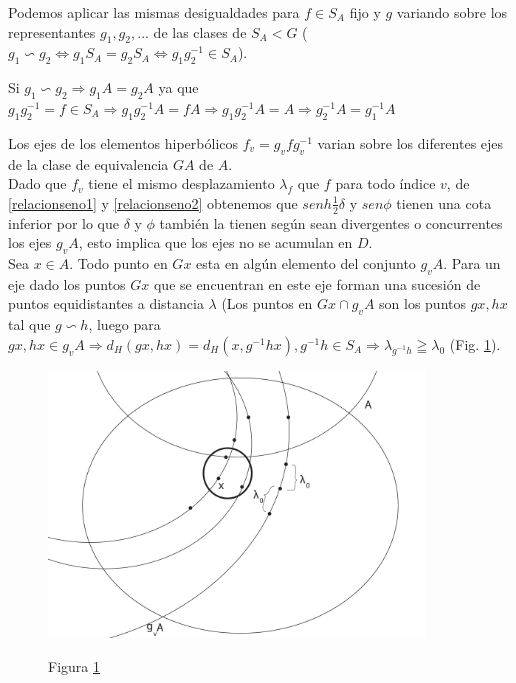 Podemos aplicar las mismas desigualdades para $f \in S_{A}$ fijo y
$g $ variando sobre los representantes $g_{1},g_{2},...$ de las
clases de $S_{A} < G$ ($g_{1} \backsim g_{2} \Leftrightarrow
g_{1}S_{A} = g_{2}S_{A} \Leftrightarrow g_{1}g_{2}^{-1} \in S_{A}$).

\begin{rem}
Si $g_{1} \backsim g_{2} \Rightarrow g_{1}A=g_{2}A$ ya que
$g_{1}g_{2}^{-1} = f \in S_{A} \Rightarrow g_{1}g_{2}^{-1}A = fA
\Rightarrow g_{1}g_{2}^{-1}A = A \Rightarrow g_{2}^{-1}A =
g_{1}^{-1}A$
\end{rem}

Los ejes de los elementos hiperb\'olicos $f_{v}=
g_{v}fg_{v}^{-1}$ varian sobre los diferentes ejes de la clase de
equivalencia $GA$ de $A$. \\

Dado que $f_{v}$ tiene el mismo desplazamiento $\lambda_{f}$ que $f$
para todo \'indice $v$, de \ref{relacionseno1} y \ref{relacionseno2} obtenemos que
$senh\frac{1}{2} \delta $ y $sen \phi$ tienen una cota inferior por
lo que $\delta$ y $\phi$ tambi\'en la tienen seg\'un sean
divergentes o concurrentes los ejes $g_{v}A$, esto implica que los
ejes no se acumulan en $D$.  \\


Sea $x \in A$. Todo punto en $Gx$ esta en alg\'un elemento del
conjunto $g_{v}A$. Para un eje dado los puntos $Gx$ que se
encuentran en este eje forman una sucesi\'on de puntos equidistantes
a distancia $\lambda$ (Los puntos en $Gx \cap g_{v}A$ son los puntos
$gx,hx$ tal que $g \backsim h $, luego para $gx,hx \in g_{v}A
\Rightarrow d_{H}(gx,hx)=d_{H}(x,g^{-1}hx), g^{-1}h \in S_{A}
\Rightarrow \lambda_{g^{-1}h} \geqq \lambda_{0}$ (Fig. \ref{lemma6-dibujo6}). \\

\begin{figure}[h]
  \centering
  \includegraphics[width=10cm]{lemma6-dibujo6}\\
  \caption{Figura \ref{lemma6-dibujo6}}\label{lemma6-dibujo6}
\end{figure}


